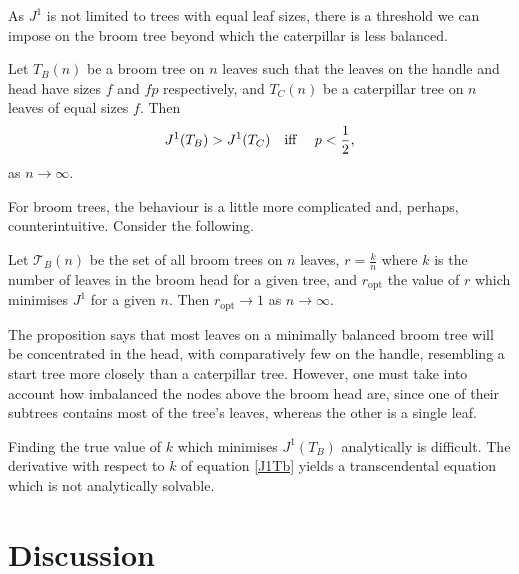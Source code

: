 As $J^1$ is not limited to trees with equal leaf sizes, there is a threshold we can impose on the broom tree beyond which the caterpillar is less balanced.

\begin{proposition}\label{p-broom-prop}
    Let $T_B(n)$ be a broom tree on $n$ leaves such that the leaves on the handle and head have sizes $f$ and $fp$ respectively, and $T_C(n)$ be a caterpillar tree on $n$ leaves of equal sizes $f$. Then
    \begin{equation}\label{p-broom-cond}
        J^1(T_B) > J^1(T_C) \text{\quad iff \quad} p<\frac{1}{2},
    \end{equation}
    as $n\to\infty$.
\end{proposition}

For broom trees, the behaviour is a little more complicated and, perhaps, counterintuitive. Consider the following.
\begin{proposition}\label{ropt_prop}
    Let $\mathcal{T}_B(n)$ be the set of all broom trees on $n$ leaves, $r = \frac{k}{n}$ where $k$ is the number of leaves in the broom head for a given tree, and $r_\text{opt}$ the value of $r$ which minimises $J^1$ for a given $n$. Then $r_\text{opt}\to 1$ as $n\to\infty$.
\end{proposition}
The proposition says that most leaves on a minimally balanced broom tree will be concentrated in the head, with comparatively few on the handle, resembling a start tree more closely than a caterpillar tree. However, one must take into account how imbalanced the nodes above the broom head are, since one of their subtrees contains most of the tree's leaves, whereas the other is a single leaf.

\par

Finding the true value of $k$ which minimises $J^1(T_B)$ analytically is difficult. The derivative with respect to $k$ of equation \eqref{J1Tb} yields a transcendental equation which is not analytically solvable.

\section{Discussion}

